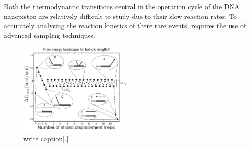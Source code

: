 Both the thermodynamic transitions central in the operation cycle of the DNA nanopiston
are relatively difficult to study due to their slow reaction rates. To accurately
analysing the reaction kinetics of there rare events, requires the use of advanced
sampling techniques.

\begin{figure}[ht]
\begin{center}
  \includegraphics[width=0.5\textwidth]{Figures/ToeholdDiagram.png}
  \caption{write caption[.]}
\end{center}
\end{figure}


